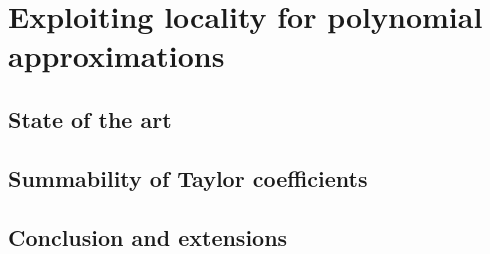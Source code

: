 \chapter{Exploiting locality for polynomial approximations}\label{ch:exploiting-locality-in-polynomial-approximations}



\section{State of the art}\label{sec:state-of-the-art}


\section{Summability of Taylor coefficients}\label{sec:summability-of-taylor-coefficients}


\section{Conclusion and extensions}\label{sec:conclusion}


\newpage\null\thispagestyle{empty}
